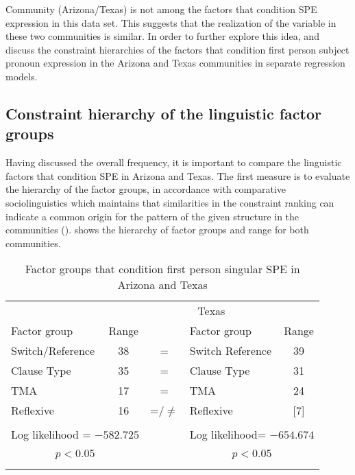 \documentclass[output=paper]{langscibook}
\begin{document}
Community (Arizona/Texas) is not among the factors that condition SPE expression in this data set. This suggests that the realization of the variable in these two communities is similar. In order to further explore this idea,  and  discuss the constraint hierarchies of the factors that condition first person subject pronoun expression in the Arizona and Texas communities in separate regression models.



\subsection{Constraint hierarchy of the linguistic factor groups}\label{sec:aztx:3.2}

Having discussed the overall frequency, it is important to compare the linguistic factors that condition SPE in Arizona and Texas. The first measure is to evaluate the hierarchy of the factor groups, in accordance with comparative sociolinguistics which maintains that similarities in the constraint ranking can indicate a common origin for the pattern of the given structure in the communities (\citealt{Tagliamonte2003}).  shows the hierarchy of factor groups and range for both communities.


\begin{table}
\begin{tabular}{lc c lc}
\lsptoprule

\multicolumn{2}{c}{Arizona} &  & \multicolumn{2}{c}{Texas}\\\cmidrule(lr){1-2}\cmidrule(lr){4-5}
{Factor group} & {Range} &  & {Factor group} & {Range}\\\midrule
{Switch/Reference} & {38} & {=} & {Switch Reference} & {39}\\
{Clause Type} & {35} & {=} & {Clause Type} & {31}\\
{TMA} & {17} & {=} & {TMA} & {24}\\
{Reflexive} & {16} & {=/${\neq}$} & {Reflexive} & {[7]}\\
&  &  &  & \\
\multicolumn{2}{c}{Log likelihood = $-582.725$} &  & \multicolumn{2}{c}{Log likelihood= $-654.674$}\\
\multicolumn{2}{c}{$p < 0.05$} & {~} & \multicolumn{2}{c}{$p < 0.05$}\\
\lspbottomrule
\end{tabular}
\caption{Factor groups that condition first person singular SPE in Arizona and Texas}
\label{tab:aztx:4}
\end{table}
\end{document}

